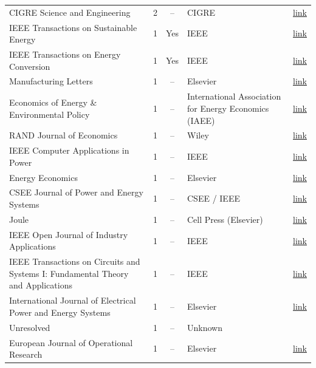 \begin{table}[htbp]
\begin{tabular}{lrcll}
    CIGRE Science and Engineering & 2 & -- & CIGRE & \href{https://cse.cigre.org/}{link} \\
    IEEE Transactions on Sustainable Energy & 1 & Yes & IEEE & \href{https://ieeexplore.ieee.org/xpl/RecentIssue.jsp?punumber=5165391}{link} \\
    IEEE Transactions on Energy Conversion & 1 & Yes & IEEE & \href{https://ieeexplore.ieee.org/xpl/RecentIssue.jsp?punumber=60}{link} \\
    Manufacturing Letters & 1 & -- & Elsevier & \href{https://www.sciencedirect.com/journal/manufacturing-letters}{link} \\
    Economics of Energy \& Environmental Policy & 1 & -- & International Association for Energy Economics (IAEE) & \href{https://www.iaee.org/en/publications/eeepjournal.aspx}{link} \\
    RAND Journal of Economics & 1 & -- & Wiley & \href{https://onlinelibrary.wiley.com/journal/17562171}{link} \\
    IEEE Computer Applications in Power & 1 & -- & IEEE & \href{https://ieeexplore.ieee.org/xpl/RecentIssue.jsp?punumber=67}{link} \\
    Energy Economics & 1 & -- & Elsevier & \href{https://www.sciencedirect.com/journal/energy-economics}{link} \\
    CSEE Journal of Power and Energy Systems & 1 & -- & CSEE / IEEE & \href{https://ieeexplore.ieee.org/xpl/RecentIssue.jsp?punumber=7054730}{link} \\
    Joule & 1 & -- & Cell Press (Elsevier) & \href{https://www.cell.com/joule/home}{link} \\
    IEEE Open Journal of Industry Applications & 1 & -- & IEEE & \href{https://ieeexplore.ieee.org/xpl/RecentIssue.jsp?punumber=8782707}{link} \\
    IEEE Transactions on Circuits and Systems I: Fundamental Theory and Applications & 1 & -- & IEEE & \href{https://ieeexplore.ieee.org/xpl/RecentIssue.jsp?punumber=81}{link} \\
    International Journal of Electrical Power and Energy Systems & 1 & -- & Elsevier & \href{https://www.sciencedirect.com/journal/international-journal-of-electrical-power-and-energy-systems}{link} \\
    Unresolved & 1 & -- & Unknown &  \\
    European Journal of Operational Research & 1 & -- & Elsevier & \href{https://www.sciencedirect.com/journal/european-journal-of-operational-research}{link} \\

\end{tabular}
\end{table}
